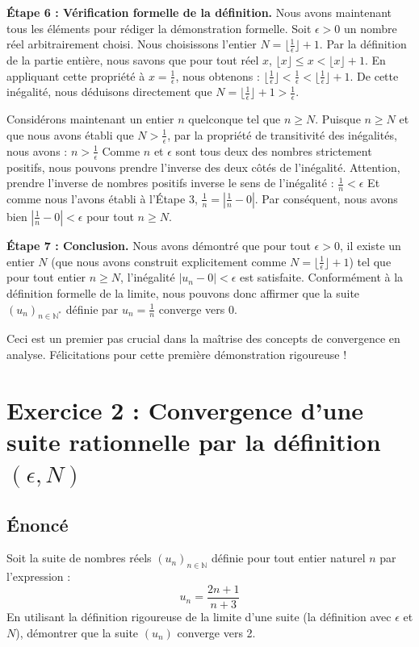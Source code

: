 \documentclass[a4paper,11pt]{report}
\begin{document}
\textbf{Étape 6 : Vérification formelle de la définition.}
Nous avons maintenant tous les éléments pour rédiger la démonstration formelle.
Soit $\epsilon > 0$ un nombre réel arbitrairement choisi.
Nous choisissons l'entier $N = \lfloor \frac{1}{\epsilon} \rfloor + 1$.
Par la définition de la partie entière, nous savons que pour tout réel $x$, $\lfloor x \rfloor \le x < \lfloor x \rfloor + 1$.
En appliquant cette propriété à $x = \frac{1}{\epsilon}$, nous obtenons :
$\lfloor \frac{1}{\epsilon} \rfloor < \frac{1}{\epsilon} < \lfloor \frac{1}{\epsilon} \rfloor + 1$.
De cette inégalité, nous déduisons directement que $N = \lfloor \frac{1}{\epsilon} \rfloor + 1 > \frac{1}{\epsilon}$.

Considérons maintenant un entier $n$ quelconque tel que $n \ge N$.
Puisque $n \ge N$ et que nous avons établi que $N > \frac{1}{\epsilon}$, par la propriété de transitivité des inégalités, nous avons :
$n > \frac{1}{\epsilon}$
Comme $n$ et $\epsilon$ sont tous deux des nombres strictement positifs, nous pouvons prendre l'inverse des deux côtés de l'inégalité. Attention, prendre l'inverse de nombres positifs inverse le sens de l'inégalité :
$\frac{1}{n} < \epsilon$
Et comme nous l'avons établi à l'Étape 3, $\frac{1}{n} = \left| \frac{1}{n} - 0 \right|$.
Par conséquent, nous avons bien $\left| \frac{1}{n} - 0 \right| < \epsilon$ pour tout $n \ge N$.

\textbf{Étape 7 : Conclusion.}
Nous avons démontré que pour tout $\epsilon > 0$, il existe un entier $N$ (que nous avons construit explicitement comme $N = \lfloor \frac{1}{\epsilon} \rfloor + 1$) tel que pour tout entier $n \ge N$, l'inégalité $|u_n - 0| < \epsilon$ est satisfaite.
Conformément à la définition formelle de la limite, nous pouvons donc affirmer que la suite $(u_n)_{n \in \mathbb{N}^*}$ définie par $u_n = \frac{1}{n}$ converge vers 0.

Ceci est un premier pas crucial dans la maîtrise des concepts de convergence en analyse. Félicitations pour cette première démonstration rigoureuse !

\vspace{1cm}

\section*{Exercice 2 : Convergence d'une suite rationnelle par la définition $(\epsilon, N)$}
\subsection*{Énoncé}
Soit la suite de nombres réels $(u_n)_{n \in \mathbb{N}}$ définie pour tout entier naturel $n$ par l'expression :
$$u_n = \frac{2n+1}{n+3}$$
En utilisant la définition rigoureuse de la limite d'une suite (la définition avec $\epsilon$ et $N$), démontrer que la suite $(u_n)$ converge vers 2.
\end{document}
